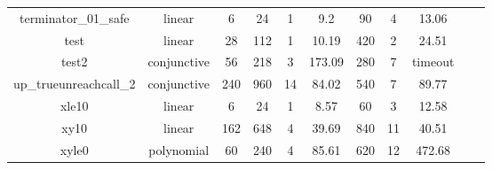 \begin{table}[t]
\begin{tabular}{l c | c c c c| c c c | c c }
\multicolumn{1}{|c|}{terminator\_01\_safe}         							&linear 		&6 &24 &1 &9.2  &90  &4  &13.06  & &  \\
\multicolumn{1}{|c|}{test}         											&linear 		&28 &112 &1 &10.19  &420 &2  &24.51  & &  \\
\multicolumn{1}{|c|}{test2}         										&conjunctive 	&56 &218 &3 &173.09  &280  &7  &timeout  & &  \\
\multicolumn{1}{|c|}{up\_true\text{-}unreach\text{-}call\_2}         		&conjunctive 	&240 &960 &14 &84.02  &540 &7   &89.77  & &  \\
\multicolumn{1}{|c|}{xle10}         										&linear 		&6 &24 &1 &8.57  &60 &3   &12.58  & &  \\
\multicolumn{1}{|c|}{xy10}         											&linear 		&162 &648 &4 &39.69  &840  &11  &40.51  & &  \\
\multicolumn{1}{|c|}{xyle0}         										&polynomial 	&60 &240 &4 &85.61  &620   &12 &472.68  & &  \\
\hline
\end{tabular}
\label{tbl:stats}
\end{table}

